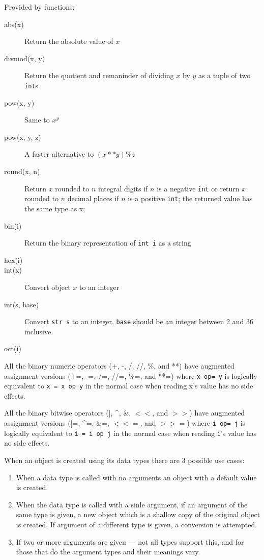 Provided by functions:
\begin{description}
\item[abs(x)] Return the absolute value of $x$
\item[divmod(x, y)] Return the quotient and remaninder of dividing $x$ by $y$ as a tuple of two \verb|int|s
\item[pow(x, y)] Same to $x^y$
\item[pow(x, y, z)] A faster alternative to $(x ** y) \% z$
\item[round(x, n)] Return $x$ rounded to $n$ integral digits if $n$ is a negative \verb|int| or return $x$ rounded to $n$ decimal places if $n$ is a positive \verb|int|; the returned value has the same type as x;
\item[bin(i)] Return the binary representation of \verb|int i| as a string
\item[hex(i)] 
\item[int(x)] Convert object $x$ to an integer
\item[int(s, base)] Convert \verb|str s| to an integer. \verb|base| should be an integer between 2 and 36 inclusive.
\item[oct(i)] 
\end{description}



All the binary numeric operators (+, -, /, //, \%, and **) have augmented assignment versions (+=, -=, /=, //=, \%=, and **=) where \verb|x op= y| is logically equivalent to \verb|x = x op y| in the normal case when reading x’s value has no side effects.

All the binary bitwise operators (|, \^{}, \&{}, $<<$, and $>>$) have augmented assignment versions (|=, \^{}=, \&{}=, $<<=$, and $>>=$) where \verb|i op= j| is logically equivalent to \verb|i = i op j| in the normal case when reading \verb|i|’s value has no side effects.


\begin{tcolorbox}
When an object is created using its data types there are 3 possible use cases:
\begin{enumerate}
\item When a data type is called with no arguments an object with a default value is created.
\item When the data type is called with a sinle argument, if an argument of the same type is given, a new object which is a shallow copy of the original object is created. If argument of a different type is given, a conversion is attempted.
\item If two or more arguments are given --- not all types support this, and for those that do the argument types and their meanings vary.
\end{enumerate}
\end{tcolorbox}


